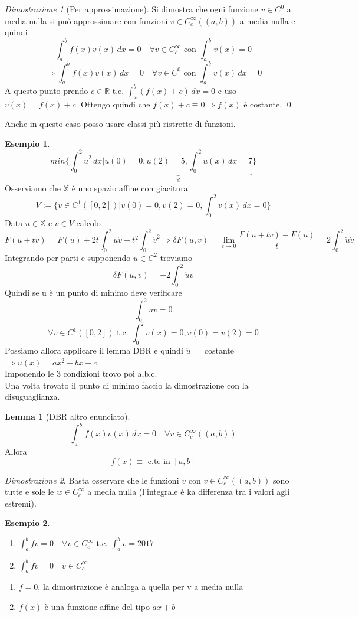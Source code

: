 \documentclass[a4paper]{book}
\theoremstyle{definition}
\newtheorem{ex}{Esempio}
\theoremstyle{remark}
\newtheorem{dimst}{Dimostrazione}
\theoremstyle{definition}
\newtheorem{lem}{Lemma}
\newcommand{\bbx}{\mathbb{X}}
\newcommand{\bbr}{\mathbb{R}}
\newcommand{\ra}{\Rightarrow}
\begin{document}
\begin{dimst}[Per approssimazione]
Si dimostra che ogni funzione $v \in C^0$ a media nulla si può approssimare con funzioni $v \in C^\infty_c((a,b))$ a media nulla e quindi 
\[
	\int_a^b f(x)v(x)\,dx = 0\quad \forall v \in C^\infty_c \text{ con } \int_a^b v(x) = 0 
\]
\[
	\ra \int_a^b f(x)v(x)\,dx = 0 \quad \forall v \in C^0 \text{ con } \int_a^b v(x)\,dx = 0
\]
A questo punto prendo $c \in \bbr $ t.c. $\int_a^b (f(x)+c)\,dx = 0$ e uso $v(x) = f(x)+c$. Ottengo quindi che $f(x) + c \equiv 0 \ra f(x)$ è costante. \qed
\end{dimst}
Anche in questo caso posso usare classi più ristrette di funzioni.\\
\begin{ex}
\[
	min\{\int_0^2 \dot u^2\,dx |\underbrace{ u(0) = 0, u(2) = 5, \int_0^2 u(x)\,dx = 7}_{\bbx}\}
\]
Osserviamo che $\bbx$ è uno spazio affine con giacitura
\[
	V := \{v \in C^1([0,2])|v(0) = 0, v(2) = 0, \int_0^2v(x)\, dx = 0 \}
\]
Data $u \in \bbx$ e $v \in V$ calcolo
\[
	F(u + tv) = F(u) + 2t \int_0^2 \dot u \dot v + t^2\int_0^2\dot v^2
	\ra \delta F(u,v) = \lim_{t\to0} \frac{F(u+tv)-F(u)}t = 2\int_0^2\dot u \dot v
\]
Integrando per parti e supponendo $u \in C^2$ troviamo
\[
	\delta F (u,v) = -2 \int_0^2 \ddot u v
\]
Quindi se u è un punto di minimo deve verificare
\[
	\int_0^2 \ddot u v = 0
\]
\[
	\forall v \in C^1([0,2]) \text{ t.c. } \int_0^2v(x) = 0, v(0)=v(2)=0
\]
Possiamo allora applicare il lemma DBR e quindi $\ddot u = $ costante $\ra u(x) = ax^2+bx+c$.\\
Imponendo le 3 condizioni trovo poi a,b,c.\\
Una volta trovato il punto di minimo faccio la dimostrazione con la disuguaglianza.
\end{ex}
\begin{lem}[DBR altro enunciato]
\[
	\int_a^b f(x)\dot v(x)\, dx = 0\quad \forall v \in C^\infty_c((a,b))
\]
Allora
\[
	f(x) \equiv \text{ c.te in } [a,b]
\]
\end{lem}

\begin{dimst}
Basta osservare che le funzioni $\dot v$ con $v \in C^\infty_c((a,b))$ sono tutte e sole le $w \in C^\infty_c$ a media nulla (l'integrale è ka differenza tra i valori agli estremi).
\end{dimst}

\begin{ex}
\begin{enumerate}
\item{$\int_a^b fv = 0\quad \forall v \in C^\infty_c \text{ t.c. } \int_a^b v = 2017 $}
\item{$\int_a^b f \ddot v = 0\quad v \in C^\infty_c $}
\end{enumerate}
\begin{enumerate}
\item{$f = 0$, la dimostrazione è analoga a quella per v a media nulla}
\item{$f(x)$ è una funzione affine del tipo $ax + b$}
\end{enumerate}
\end{ex}
\end{document}
